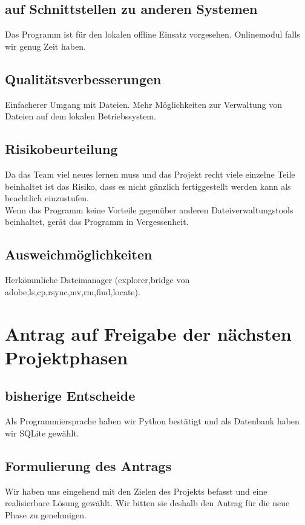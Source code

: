 \documentclass[10pt,paper=a4,final]{scrartcl}
\begin{document}
\subsection{auf Schnittstellen zu anderen Systemen}
Das Programm ist für den lokalen offline Einsatz vorgesehen. Onlinemodul falls wir genug Zeit haben.
\subsection{Qualitätsverbesserungen}
Einfacherer Umgang mit Dateien. Mehr Möglichkeiten zur Verwaltung von Dateien auf dem lokalen Betriebssystem.
\subsection{Risikobeurteilung}
Da das Team viel neues lernen muss und das Projekt recht viele einzelne Teile beinhaltet ist das Risiko, dass es nicht gänzlich fertiggestellt werden kann als beachtlich einzustufen.\\
Wenn das Programm keine Vorteile gegenüber anderen Dateiverwaltungstools beinhaltet, gerät das Programm in Vergessenheit.
\subsection{Ausweichmöglichkeiten}
Herkömmliche Dateimanager (explorer,bridge von adobe,ls,cp,rsync,mv,rm,find,locate).

\section{Antrag auf Freigabe der nächsten Projektphasen}
\subsection{bisherige Entscheide}
Als Programmiersprache haben wir Python bestätigt und als Datenbank haben wir SQLite gewählt.

\subsection{Formulierung des Antrags}
Wir haben uns eingehend mit den Zielen des Projekts befasst und eine realisierbare Lösung gewählt. Wir bitten sie deshalb den Antrag für die neue Phase zu genehmigen.
\end{document}
